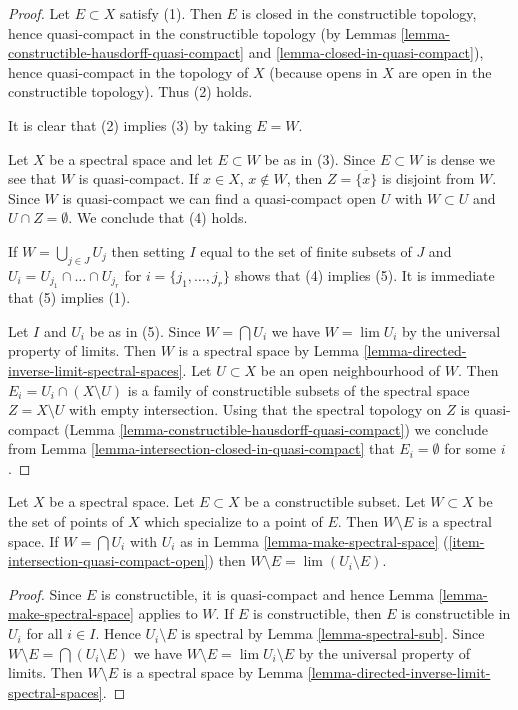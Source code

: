 \begin{proof}
Let $E \subset X$ satisfy (1). Then $E$ is closed in the constructible
topology, hence quasi-compact in the constructible topology (by
Lemmas \ref{lemma-constructible-hausdorff-quasi-compact} and
\ref{lemma-closed-in-quasi-compact}), hence quasi-compact in the topology
of $X$ (because opens in $X$ are open in the constructible topology). Thus
(2) holds.

\medskip\noindent
It is clear that (2) implies (3) by taking $E = W$.

\medskip\noindent
Let $X$ be a spectral space and let $E \subset W$ be as in (3).
Since $E \subset W$ is dense we see that $W$ is quasi-compact.
If $x \in X$, $x \not \in W$, then $Z = \overline{\{x\}}$ is
disjoint from $W$. Since $W$ is quasi-compact we can find a
quasi-compact open $U$ with $W \subset U$ and $U \cap Z = \emptyset$.
We conclude that (4) holds.

\medskip\noindent
If $W = \bigcup_{j \in J} U_j$ then setting $I$ equal to the set of
finite subsets of $J$ and $U_i = U_{j_1} \cap \ldots \cap U_{j_r}$
for $i = \{j_1, \ldots, j_r\}$ shows that (4) implies (5). It is immediate
that (5) implies (1).

\medskip\noindent
Let $I$ and $U_i$ be as in (5).
Since $W = \bigcap U_i$ we have $W = \lim U_i$ by the universal property
of limits. Then $W$ is a spectral space by
Lemma \ref{lemma-directed-inverse-limit-spectral-spaces}.
Let $U \subset X$ be an open neighbourhood of $W$.
Then $E_i = U_i \cap (X \setminus U)$ is a family of constructible
subsets of the spectral space $Z = X \setminus U$
with empty intersection. Using that the spectral topology on $Z$
is quasi-compact (Lemma \ref{lemma-constructible-hausdorff-quasi-compact})
we conclude from
Lemma \ref{lemma-intersection-closed-in-quasi-compact}
that $E_i = \emptyset$ for some $i$.
\end{proof}

\begin{lemma}
\label{lemma-make-spectral-space-minus}
Let $X$ be a spectral space. Let $E \subset X$ be a constructible subset.
Let $W \subset X$ be the set of points of $X$ which specialize
to a point of $E$. Then $W \setminus E$ is a spectral space.
If $W = \bigcap U_i$ with $U_i$ as in
Lemma \ref{lemma-make-spectral-space}
(\ref{item-intersection-quasi-compact-open})
then $W \setminus E = \lim (U_i \setminus E)$.
\end{lemma}

\begin{proof}
Since $E$ is constructible, it is quasi-compact and hence
Lemma \ref{lemma-make-spectral-space} applies to $W$.
If $E$ is constructible, then $E$ is constructible in $U_i$
for all $i \in I$. Hence $U_i \setminus E$
is spectral by Lemma \ref{lemma-spectral-sub}.
Since $W \setminus E = \bigcap (U_i \setminus E)$ we have
$W \setminus E = \lim U_i \setminus E$ by the universal property of limits.
Then $W \setminus E$ is a spectral space by
Lemma \ref{lemma-directed-inverse-limit-spectral-spaces}.
\end{proof}






